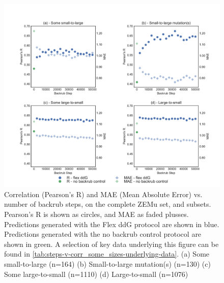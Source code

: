 \begin{figure}
  \includegraphics[width=\textwidth,keepaspectratio]{steps-v-corr_some_sizes.pdf}
  \caption[Flex ddG performance vs. number of backrub steps]{
    Correlation (Pearson's R) and MAE (Mean Absolute Error) vs. number of backrub steps, on the complete ZEMu set, and subsets.
    Pearson's R is shown as circles, and MAE as faded plusses.
Predictions generated with the Flex ddG protocol are shown in blue.
Predictions generated with the no backrub control protocol are shown in green.
    A selection of key data underlying this figure can be found in \cref{tab:steps-v-corr_some_sizes-underlying-data}.
    (a) Some small-to-large (n=164)
    (b) Small-to-large mutation(s) (n=130)
    (c) Some large-to-small (n=1110)
    (d) Large-to-small (n=1076)
  } \label{fig:steps-v-corr_some_sizes}
\end{figure}

